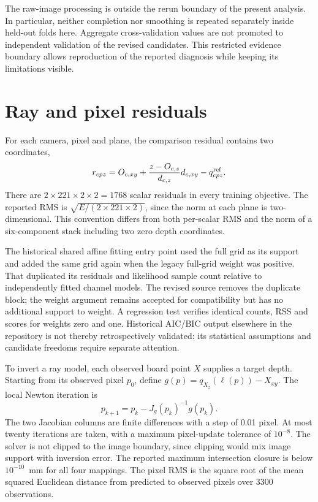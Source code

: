 \documentclass[10pt,a4paper]{article}
\begin{document}
The raw-image processing is outside the rerun boundary of the present analysis. In particular, neither completion nor smoothing is repeated separately inside held-out folds here. Aggregate cross-validation values are not promoted to independent validation of the revised candidates. This restricted evidence boundary allows reproduction of the reported diagnosis while keeping its limitations visible.

\section{Ray and pixel residuals}
For each camera, pixel and plane, the comparison residual contains two coordinates,
\begin{equation}
r_{cpz}=O_{c,xy}+\frac{z-O_{c,z}}{d_{c,z}}d_{c,xy}-q^{\rm ref}_{cpz}.
\end{equation}
There are $2\times221\times2\times2=1768$ scalar residuals in every training objective. The reported RMS is $\sqrt{E/(2\times221\times2)}$, since the norm at each plane is two-dimensional. This convention differs from both per-scalar RMS and the norm of a six-component stack including two zero depth coordinates.

The historical shared affine fitting entry point used the full grid as its support and added the same grid again when the legacy full-grid weight was positive. That duplicated its residuals and likelihood sample count relative to independently fitted channel models. The revised source removes the duplicate block; the weight argument remains accepted for compatibility but has no additional support to weight. A regression test verifies identical counts, RSS and scores for weights zero and one. Historical AIC/BIC output elsewhere in the repository is not thereby retrospectively validated: its statistical assumptions and candidate freedoms require separate attention.

To invert a ray model, each observed board point $X$ supplies a target depth. Starting from its observed pixel $p_0$, define $g(p)=q_{X_z}(\ell(p))-X_{xy}$. The local Newton iteration is
\begin{equation}
p_{k+1}=p_k-J_g(p_k)^{-1}g(p_k).
\end{equation}
The two Jacobian columns are finite differences with a step of 0.01 pixel. At most twenty iterations are taken, with a maximum pixel-update tolerance of $10^{-8}$. The solver is not clipped to the image boundary, since clipping would mix image support with inversion error. The reported maximum intersection closure is below $10^{-10}$~mm for all four mappings. The pixel RMS is the square root of the mean squared Euclidean distance from predicted to observed pixels over 3300 observations.
\end{document}
